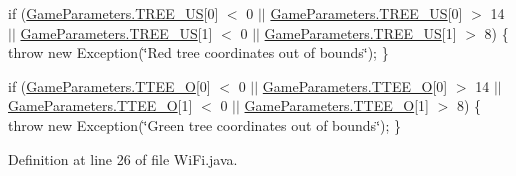 if (\hyperlink{enumca_1_1mcgill_1_1ecse211_1_1project_1_1_game_parameters_a2449dac1067326f888e8b9e8b5276c18}{Game\+Parameters.\+T\+R\+E\+E\+\_\+\+US}\mbox{[}0\mbox{]} $<$ 0 $\vert$$\vert$ \hyperlink{enumca_1_1mcgill_1_1ecse211_1_1project_1_1_game_parameters_a2449dac1067326f888e8b9e8b5276c18}{Game\+Parameters.\+T\+R\+E\+E\+\_\+\+US}\mbox{[}0\mbox{]} $>$ 14 $\vert$$\vert$ \hyperlink{enumca_1_1mcgill_1_1ecse211_1_1project_1_1_game_parameters_a2449dac1067326f888e8b9e8b5276c18}{Game\+Parameters.\+T\+R\+E\+E\+\_\+\+US}\mbox{[}1\mbox{]} $<$ 0 $\vert$$\vert$ \hyperlink{enumca_1_1mcgill_1_1ecse211_1_1project_1_1_game_parameters_a2449dac1067326f888e8b9e8b5276c18}{Game\+Parameters.\+T\+R\+E\+E\+\_\+\+US}\mbox{[}1\mbox{]} $>$ 8) \{ throw new Exception(\char`\"{}\+Red tree coordinates out of bounds\char`\"{}); \}

if (\hyperlink{enumca_1_1mcgill_1_1ecse211_1_1project_1_1_game_parameters_a50543aed3d1731225cee6fe50ebcefe0}{Game\+Parameters.\+T\+T\+E\+E\+\_\+O}\mbox{[}0\mbox{]} $<$ 0 $\vert$$\vert$ \hyperlink{enumca_1_1mcgill_1_1ecse211_1_1project_1_1_game_parameters_a50543aed3d1731225cee6fe50ebcefe0}{Game\+Parameters.\+T\+T\+E\+E\+\_\+O}\mbox{[}0\mbox{]} $>$ 14 $\vert$$\vert$ \hyperlink{enumca_1_1mcgill_1_1ecse211_1_1project_1_1_game_parameters_a50543aed3d1731225cee6fe50ebcefe0}{Game\+Parameters.\+T\+T\+E\+E\+\_\+O}\mbox{[}1\mbox{]} $<$ 0 $\vert$$\vert$ \hyperlink{enumca_1_1mcgill_1_1ecse211_1_1project_1_1_game_parameters_a50543aed3d1731225cee6fe50ebcefe0}{Game\+Parameters.\+T\+T\+E\+E\+\_\+O}\mbox{[}1\mbox{]} $>$ 8) \{ throw new Exception(\char`\"{}\+Green tree coordinates out of bounds\char`\"{}); \} 

Definition at line 26 of file Wi\+Fi.\+java.


